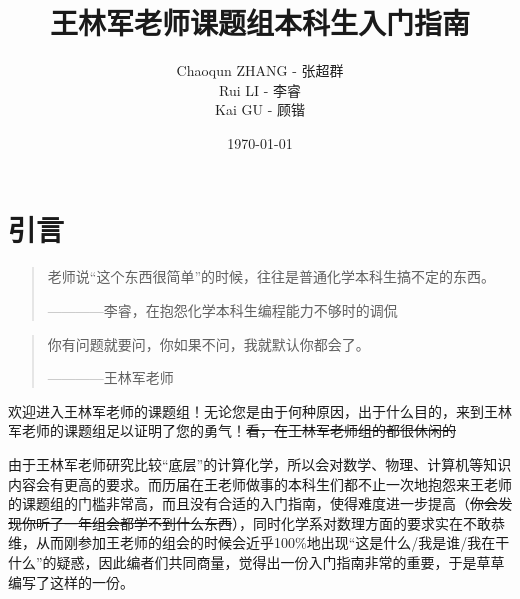 \documentclass[12pt,a4paper,openany,twoside]{book}
\title{王林军老师课题组本科生入门指南}
\author{Chaoqun ZHANG - 张超群\\Rui LI - 李睿\\Kai GU - 顾锴}
\date{\today}
\numberwithin{equation}{section}
\begin{document}
    \maketitle
    \tableofcontents
    \setcounter{page}{1}   %
    \makeatletter
    \let\ps@plain\ps@empty
    \makeatother
    \tableofcontents                                    %
    \mainmatter\medskip    %
    
    
    
    \newpage
    \chapter*{引言}
      \begin{quote}
        老师说“这个东西很简单”的时候，往往是普通化学本科生搞不定的东西。
        \begin{flushright}
          ————李睿，在抱怨化学本科生编程能力不够时的调侃
        \end{flushright}
      \end{quote}
      \begin{quote}
        你有问题就要问，你如果不问，我就默认你都会了。
        \begin{flushright}
          ————王林军老师
        \end{flushright}
      \end{quote}

      欢迎进入王林军老师的课题组！无论您是由于何种原因，出于什么目的，来到王林军老师的课题组足以证明了您的勇气！\sout{看，在王林军老师组的都很休闲的}

      由于王林军老师研究比较“底层”的计算化学，所以会对数学、物理、计算机等知识内容会有更高的要求。而历届在王老师做事的本科生们都不止一次地抱怨来王老师的课题组的门槛非常高，而且没有合适的入门指南，使得难度进一步提高（\sout{你会发现你听了一年组会都学不到什么东西}），同时化学系对数理方面的要求实在不敢恭维，从而刚参加王老师的组会的时候会近乎100\%地出现“这是什么/我是谁/我在干什么”的疑惑，因此编者们共同商量，觉得出一份入门指南非常的重要，于是草草编写了这样的一份。
\end{document}
